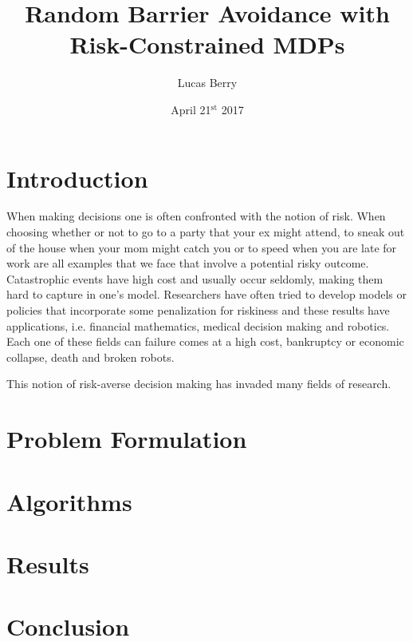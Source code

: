 \documentclass[12pt]{article}
\title{Random Barrier Avoidance with Risk-Constrained MDPs}
\author{Lucas Berry}
\date{April 21$^{\text{st}}$ 2017}
\begin{document}
	\maketitle
	\section{Introduction}
	When making decisions one is often confronted with the notion of risk. When choosing whether or not to go to a party that your ex might attend, to sneak out of the house when your mom might catch you or to speed when you are late for work are all examples that we face that involve a potential risky outcome. Catastrophic events have high cost and usually occur seldomly, making them hard to capture in one's model. Researchers have often tried to develop models or policies that incorporate some penalization for riskiness and these results have applications, i.e. financial mathematics, medical decision making and robotics. Each one of these fields can failure comes at a high cost, bankruptcy or economic collapse, death and broken robots.   
	
	This notion of risk-averse decision making has invaded many fields of research.  
	
	\section{Problem Formulation}
	\section{Algorithms}
	\section{Results}
	\section{Conclusion}  
	
\end{document}
